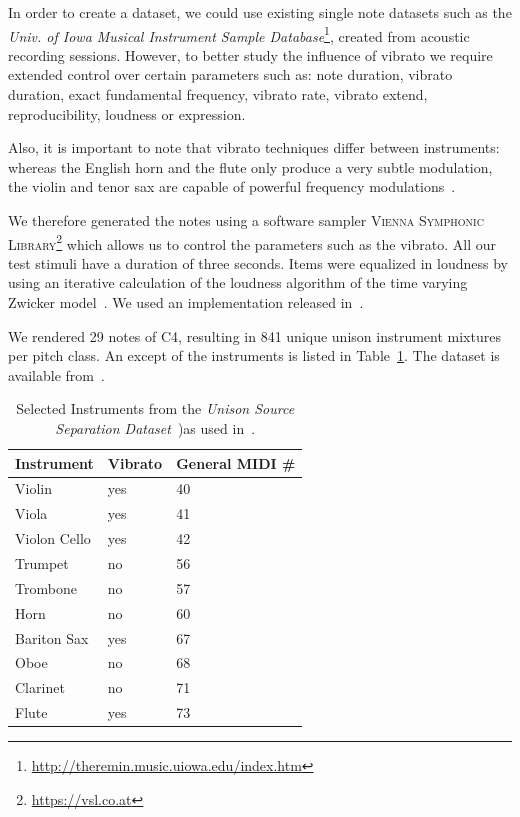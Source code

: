 \par
In order to create a dataset, we could use existing single note datasets such as the \emph{Univ. of Iowa Musical Instrument Sample Database}\footnote{\url{http://theremin.music.uiowa.edu/index.htm}}, created from acoustic recording sessions.
However, to better study the influence of vibrato we require extended control over certain parameters such as: note duration, vibrato duration, exact fundamental frequency, vibrato rate, vibrato extend, reproducibility, loudness or expression.
\par
Also, it is important to note that vibrato techniques differ between instruments: whereas the English horn and the flute only produce a very subtle modulation, the violin and tenor sax are capable of powerful frequency modulations~\cite{gilbert05}.
\par
We therefore generated the notes using a software sampler \textsc{Vienna Symphonic Library}\footnote{\url{https://vsl.co.at}} which allows us to control the parameters such as the vibrato.
All our test stimuli have a duration of three seconds.
Items were equalized in loudness by using an iterative calculation of the loudness algorithm of the time varying Zwicker model~\cite{zwicker13}. 
We used an implementation released in~\cite{genesis12}. 
\par
We rendered 29 notes of C4, resulting in 841 unique unison instrument mixtures per pitch class.
An except of the instruments is listed in Table~\ref{tab:testset}.
The dataset is available from~\cite{oss_unison}.

\begin{table}
\begin{center}
\footnotesize
\begin{tabular}{ l l l}
  Instrument & Vibrato &  General MIDI \# \\
  \hline
  Violin & yes & 40 \\
  Viola & yes & 41 \\
  Violon Cello & yes & 42 \\
  Trumpet & no & 56 \\
  Trombone & no & 57\\
  Horn & no & 60  \\
  Bariton Sax & yes & 67 \\
  Oboe & no & 68\\
  Clarinet & no & 71\\
  Flute & yes & 73\\
\end{tabular}
\end{center}
\caption{Selected Instruments from the \emph{Unison Source Separation Dataset}~\cite{oss_unison})as used in~\cite{stoeter14, stoeter16}.}
\label{tab:testset}
\end{table}

